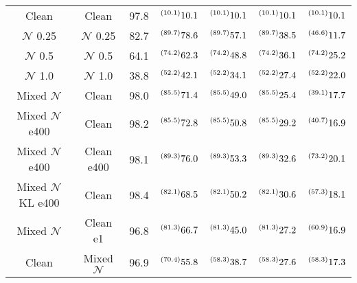 \begin{table*}[t]
\begin{tabular}{cc|c|cccc}
    Clean                       & Clean                      & 97.8  &  $ \prescript{(10.1)}{}{10.1}$   &   $ \prescript{(10.1)}{}{10.1}$     &    $ \prescript{(10.1)}{}{10.1}$    &   $ \prescript{(10.1)}{}{10.1}$      \\
    $\mathcal{N}$ 0.25                     & $\mathcal{N}$ 0.25                    & 82.7  &  $ \prescript{(89.7)}{}{78.6}$   &   $ \prescript{(89.7)}{}{57.1}$     &    $ \prescript{(89.7)}{}{38.5}$    &   $ \prescript{(46.6)}{}{11.7}$      \\
    $\mathcal{N}$ 0.5                      & $\mathcal{N}$ 0.5                     & 64.1  &  $ \prescript{(74.2)}{}{62.3}$   &   $ \prescript{(74.2)}{}{48.8}$     &    $ \prescript{(74.2)}{}{36.1}$    &   $ \prescript{(74.2)}{}{25.2}$      \\
    $\mathcal{N}$ 1.0                      & $\mathcal{N}$ 1.0                     & 38.8  &  $ \prescript{(52.2)}{}{42.1}$   &   $ \prescript{(52.2)}{}{34.1}$     &    $ \prescript{(52.2)}{}{27.4}$    &   $ \prescript{(52.2)}{}{22.0
    }$      \\
    Mixed $\mathcal{N}$                    & Clean                      & 98.0  &  $ \prescript{(85.5)}{}{71.4}$   &   $ \prescript{(85.5)}{}{49.0}$     &    $ \prescript{(85.5)}{}{25.4}$    &   $ \prescript{(39.1)}{}{17.7}$      \\ \hline
    Mixed $\mathcal{N}$ e400                    & Clean                      & 98.2  &  $ \prescript{(85.5)}{}{72.8}$   &   $ \prescript{(85.5)}{}{50.8}$     &    $ \prescript{(85.5)}{}{29.2}$    &   $ \prescript{(40.7)}{}{16.9}$      \\ \hline
    Mixed $\mathcal{N}$ e400                    & Clean e400                      & 98.1  &  $ \prescript{(89.3)}{}{76.0}$   &   $ \prescript{(89.3)}{}{53.3}$     &    $ \prescript{(89.3)}{}{32.6}$    &   $ \prescript{(73.2)}{}{20.1}$      \\ \hline
    Mixed $\mathcal{N}$ KL e400                  & Clean                      & 98.4  &  $ \prescript{(82.1)}{}{68.5}$   &   $ \prescript{(82.1)}{}{50.2}$     &    $ \prescript{(82.1)}{}{30.6}$    &   $ \prescript{(57.3)}{}{18.1}$      \\ \hline
    Mixed $\mathcal{N}$                  & Clean e1                     & 96.8  &  $ \prescript{(81.3)}{}{66.7}$   &   $ \prescript{(81.3)}{}{45.0}$     &    $ \prescript{(81.3)}{}{27.2}$    &   $ \prescript{(60.9)}{}{16.9}$      \\ \hline
    Clean   &  Mixed $\mathcal{N}$     & 96.9  &  $ \prescript{(70.4)}{}{55.8}$   &   $ \prescript{(58.3)}{}{38.7}$     &    $ \prescript{(58.3)}{}{27.6}$    &   $ \prescript{(58.3)}{}{17.3}$      \\ \hline

\end{tabular}
\end{table*}

